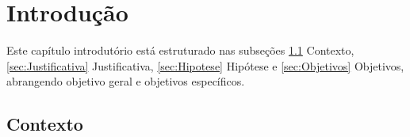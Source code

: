\documentclass[
    12pt,                %
    openright,           %
    oneside,             %
    a4paper,             %
    english,             %
    brazil               %
]{abntex2}
\begin{document}
\cleardoublepage


\tableofcontents*
\cleardoublepage

\textual

\chapter{Introdução}
\label{cap:introducao}

Este capítulo introdutório está estruturado nas subseções \ref{sec:Contexto} Contexto, \ref{sec:Justificativa} Justificativa, \ref{sec:Hipotese} Hipótese e \ref{sec:Objetivos} Objetivos, abrangendo objetivo geral e objetivos específicos.

\section{Contexto}
\label{sec:Contexto}
\end{document}
